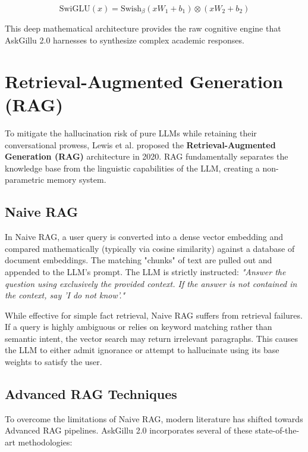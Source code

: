 \documentclass[12pt,a4paper]{report}
\begin{document}
\begin{equation}
    \text{SwiGLU}(x) = \text{Swish}_\beta(xW_1 + b_1) \otimes (xW_2 + b_2)
\end{equation}

This deep mathematical architecture provides the raw cognitive engine that AskGillu 2.0 harnesses to synthesize complex academic responses.

\section{Retrieval-Augmented Generation (RAG)}
To mitigate the hallucination risk of pure LLMs while retaining their conversational prowess, Lewis et al. proposed the \textbf{Retrieval-Augmented Generation (RAG)} architecture in 2020. RAG fundamentally separates the knowledge base from the linguistic capabilities of the LLM, creating a non-parametric memory system.

\subsection{Naive RAG}
In Naive RAG, a user query is converted into a dense vector embedding and compared mathematically (typically via cosine similarity) against a database of document embeddings. The matching "chunks" of text are pulled out and appended to the LLM's prompt. The LLM is strictly instructed: \textit{"Answer the question using exclusively the provided context. If the answer is not contained in the context, say 'I do not know'."}

While effective for simple fact retrieval, Naive RAG suffers from retrieval failures. If a query is highly ambiguous or relies on keyword matching rather than semantic intent, the vector search may return irrelevant paragraphs. This causes the LLM to either admit ignorance or attempt to hallucinate using its base weights to satisfy the user.

\subsection{Advanced RAG Techniques}
To overcome the limitations of Naive RAG, modern literature has shifted towards Advanced RAG pipelines. AskGillu 2.0 incorporates several of these state-of-the-art methodologies:
\end{document}
